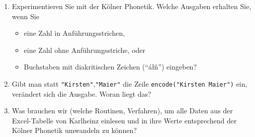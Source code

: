 \begin{enumerate}
\itemsep1pt\parskip0pt
\item
  {Experimentieren Sie mit der Kölner Phonetik. Welche Ausgaben erhalten
  Sie, wenn Sie}

  \begin{itemize}
  \itemsep1pt\parskip0pt
  \item
    {eine Zahl in Anführungsstrichen,}
  \item
    {eine Zahl ohne Anführungsstriche, oder}
  \item
    {Buchstaben mit diakritischen Zeichen (``áłň'') eingeben?}
  \end{itemize}
\item
  {Gibt man statt
  \verb|"Kirsten"|,\verb|"Maier"|
  die Zeile \texttt{encode("Kirsten\ Maier")} ein, verändert sich die
  Ausgabe. Woran liegt das?}
\item
  {Was brauchen wir (welche Routinen, Verfahren), um alle Daten aus der
  Excel-Tabelle von Karlheinz einlesen und in ihre Werte entsprechend
  der Kölner Phonetik umwandeln zu können?}
\end{enumerate}


